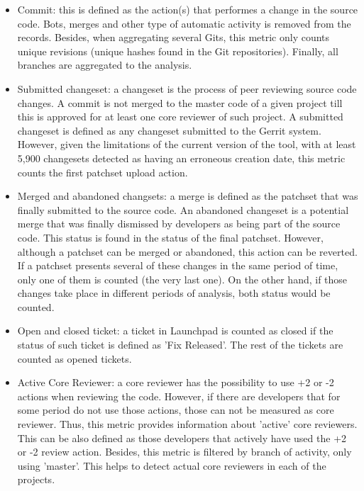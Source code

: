 \documentclass[a4wide,11pt]{report}
\begin{document}
\begin{itemize}
\item Commit: this is defined as the action(s) that performes a change in the source code. 
Bots, merges and other type of automatic activity is removed from the records. Besides,
when aggregating several Gits, this metric only counts unique revisions (unique hashes found in the Git repositories).
Finally, all branches are aggregated to the analysis.

\item Submitted changeset: a changeset is the process of peer reviewing source code changes. A commit
is not merged to the master code of a given project till this is approved for at least one core
reviewer of such project. A submitted changeset is defined as any changeset submitted to the Gerrit
system. However, given the limitations of the current version of the tool, with at least 5,900 changesets
detected as having an erroneous creation date, this metric counts the first patchset upload action. 
 
\item Merged and abandoned changsets: a merge is defined as the patchset that was finally submitted to the 
source code. An abandoned changeset is a potential merge that was finally dismissed by developers as
being part of the source code. This status is found in the status of the final patchset. However, although
a patchset can be merged or abandoned, this action can be reverted. If a patchset presents several of 
these changes in the same period of time, only one of them is counted (the very last one). On the other hand,
if those changes take place in different periods of analysis, both status would be counted.

\item Open and closed ticket: a ticket in Launchpad is counted as closed if the status of such ticket is defined as 'Fix Released'.
The rest of the tickets are counted as opened tickets.

\item Active Core Reviewer: a core reviewer has the possibility to use +2 or -2 actions when reviewing the code. 
However, if there are developers that for some period do not use those actions, those can not be measured as core reviewer.
Thus, this metric provides information about 'active' core reviewers. This can be also defined as those developers
that actively have used the +2 or -2 review action. Besides, this metric is filtered by branch of activity, only using 'master'.
This helps to detect actual core reviewers in each of the projects.


\end{itemize}
\end{document}
